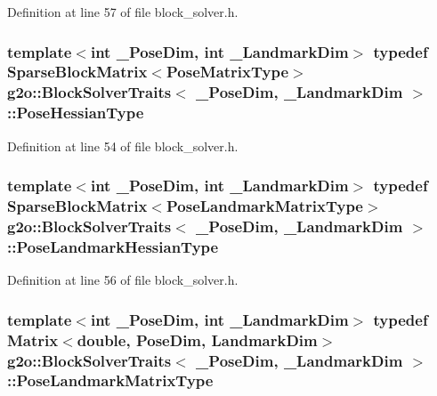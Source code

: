 Definition at line 57 of file block\+\_\+solver.\+h.

\subsubsection[{\texorpdfstring{Pose\+Hessian\+Type}{PoseHessianType}}]{\setlength{\rightskip}{0pt plus 5cm}template$<$int \+\_\+\+Pose\+Dim, int \+\_\+\+Landmark\+Dim$>$ typedef {\bf Sparse\+Block\+Matrix}$<${\bf Pose\+Matrix\+Type}$>$ {\bf g2o\+::\+Block\+Solver\+Traits}$<$ \+\_\+\+Pose\+Dim, \+\_\+\+Landmark\+Dim $>$\+::{\bf Pose\+Hessian\+Type}}\hypertarget{structg2o_1_1BlockSolverTraits_a03351362339d8e6609c577123350bb2a}{}\label{structg2o_1_1BlockSolverTraits_a03351362339d8e6609c577123350bb2a}


Definition at line 54 of file block\+\_\+solver.\+h.

\subsubsection[{\texorpdfstring{Pose\+Landmark\+Hessian\+Type}{PoseLandmarkHessianType}}]{\setlength{\rightskip}{0pt plus 5cm}template$<$int \+\_\+\+Pose\+Dim, int \+\_\+\+Landmark\+Dim$>$ typedef {\bf Sparse\+Block\+Matrix}$<${\bf Pose\+Landmark\+Matrix\+Type}$>$ {\bf g2o\+::\+Block\+Solver\+Traits}$<$ \+\_\+\+Pose\+Dim, \+\_\+\+Landmark\+Dim $>$\+::{\bf Pose\+Landmark\+Hessian\+Type}}\hypertarget{structg2o_1_1BlockSolverTraits_af8ef27915a056caae3b12a9ca609eba6}{}\label{structg2o_1_1BlockSolverTraits_af8ef27915a056caae3b12a9ca609eba6}


Definition at line 56 of file block\+\_\+solver.\+h.

\subsubsection[{\texorpdfstring{Pose\+Landmark\+Matrix\+Type}{PoseLandmarkMatrixType}}]{\setlength{\rightskip}{0pt plus 5cm}template$<$int \+\_\+\+Pose\+Dim, int \+\_\+\+Landmark\+Dim$>$ typedef Matrix$<$double, {\bf Pose\+Dim}, {\bf Landmark\+Dim}$>$ {\bf g2o\+::\+Block\+Solver\+Traits}$<$ \+\_\+\+Pose\+Dim, \+\_\+\+Landmark\+Dim $>$\+::{\bf Pose\+Landmark\+Matrix\+Type}}\hypertarget{structg2o_1_1BlockSolverTraits_a91e6510ad42179701d22c3ac312237cd}{}\label{structg2o_1_1BlockSolverTraits_a91e6510ad42179701d22c3ac312237cd}


